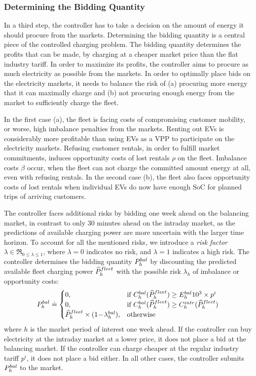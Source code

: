 \documentclass[a4paper, 12pt]{article}
\begin{document}
\subsubsection{Determining the Bidding Quantity}
\label{sec:orgbccbd5f}
In a third step, the controller has to take a decision on the amount of energy
it should procure from the markets. Determining the bidding quantity is a
central piece of the controlled charging problem. The bidding quantity
determines the profits that can be made, by charging at a cheaper market price
than the flat industry tariff. In order to maximize its profits, the controller
aims to procure as much electricity as possible from the markets. In order to
optimally place bids on the electricity markets, it needs to balance the risk of
(a) procuring more energy that it can maximally charge and (b) not procuring
enough energy from the market to sufficiently charge the fleet.

In the first case (a), the fleet is facing costs of compromising customer
mobility, or worse, high imbalance penalties from the markets. Renting out EVs
is considerably more profitable than using EVs as a VPP to participate on the
electricity markets. Refusing customer rentals, in order to fulfill market
commitments, induces opportunity costs of lost rentals \(\rho\) on the fleet.
Imbalance costs \(\beta\) occur, when the fleet can not charge the committed
amount energy at all, even with refusing rentals. In the second case (b), the
fleet also faces opportunity costs of lost rentals when individual EVs do now
have enough SoC for planned trips of arriving customers.

The controller faces additional risks by bidding one week ahead on the balancing
market, in contrast to only 30 minutes ahead on the intraday market, as the
predictions of available charging power are more uncertain with the larger time
horizon. To account for all the mentioned risks, we introduce a \emph{risk factor}
\(\lambda \in \Re_{0 \leq \lambda \leq 1}\), where \(\lambda = 0\) indicates no
risk, and \(\lambda = 1\) indicates a high risk. The controller determines the
bidding quantity \(P^{bal}_{h}\) by discounting the predicted available fleet charging
power \(\widehat{P}^{fleet}_{h}\) with the possible risk \(\lambda_{h}\) of imbalance or
opportunity costs:
\begin{equation} \label{eq-model-pb}
  P^{bal}_{h} \doteq
  \begin{cases}
    0, & \text{if}\ C^{bal}_{h}(\widehat{P}^{fleet}_{h}) \geq E^{bal}_{h}10^3 \times p^{i}\\
    0, & \text{if}\ C^{bal}_{h}(\widehat{P}^{fleet}_{h}) \geq C^{intr}_{h}(\widehat{P}^{fleet}_{h})\\
    \widehat{P}^{fleet}_{h} \times (1\!-\!\lambda^{bal}_{h}), & \text{otherwise}
  \end{cases}
\end{equation}
where \(h\) is the market period of interest one week ahead. If the controller can
buy electricity at the intraday market at a lower price, it does not place a bid
at the balancing market. If the controller can charge cheaper at the regular
industry tariff \(p^{i}\), it does not place a bid either. In all other cases, the
controller submits \(P^{bal}_{h}\) to the market.
\end{document}
